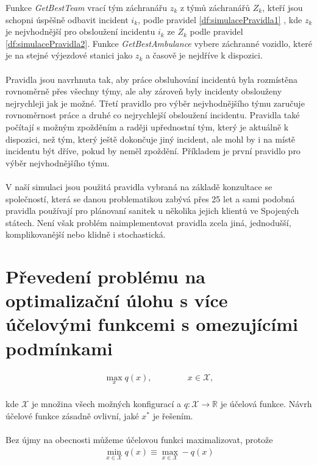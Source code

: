 Funkce \textit{GetBestTeam}\label{df:getBestTeam} vrací tým záchranářu $z_k$ z týmů záchranářů $Z_k$, kteří jsou schopni úspěšně odbavit incident $i_k$, podle pravidel \ref{df:simulacePravidla1}
, kde $z_k$ je nejvhodnější pro obsloužení incidentu $i_k$ ze $Z_k$ podle pravidel \ref{df:simulacePravidla2}. 
Funkce \textit{GetBestAmbulance}\label{df:getBestAmbulance} vybere záchranné vozidlo, které je na stejné výjezdové stanici jako $z_k$ a časově je nejdříve k dispozici.
\\
\\
Pravidla jsou navrhnuta tak, aby práce obsluhování incidentů byla rozmístěna rovnoměrně přes všechny týmy, ale aby zároveň byly incidenty obslouženy nejrychleji jak je možné.
Třetí pravidlo pro výběr nejvhodnějšího týmu zaručuje rovnoměrnost práce a druhé co nejrychlejší obsloužení incidentu.
Pravidla také počítají s možným zpožděním a raději upřednostní tým, který je aktuálně k dispozici, než tým, který ještě dokončuje jiný incident, ale mohl by i na místě incidentu
být dříve, pokud by neměl zpoždění. Příkladem je první pravidlo pro výběr nejvhodnějšího týmu.
\\
\\
V naší simulaci jsou použitá pravidla vybraná na základě konzultace se společností, která se danou problematikou zabývá přes 25 let a sami podobná pravidla používají pro plánovaní sanitek
u několika jejich klientů ve Spojených státech.
Není však problém naimplementovat pravidla zcela jiná, jednodušší, komplikovanější nebo klidně i stochastická.

\section{Převedení problému na optimalizační úlohu s více účelovými funkcemi s omezujícími podmínkami}\label{kap:optUloha2uc}

\begin{definice}\label{df:optUloha1ucObecne}
  \begin{align*}
    \max_{x} q(x), \hspace{50pt} x \in \mathcal{X},
  \end{align*}
  \\
  kde $\mathcal{X}$ je množina všech možných konfigurací a $q \colon \mathcal{X} \rightarrow \mathbb{R}$ je účelová funkce.
  Návrh účelové funkce zásadně ovlivní, jaké $x^*$ je řešením.
  \\
  \\
  Bez újmy na obecnosti můžeme účelovou funkci maximalizovat, protože
  \begin{align*}
    \min_{x \in \mathcal{X}} q(x) \equiv \max_{x \in \mathcal{X}} -q(x)
  \end{align*}
  \\
\end{definice}

